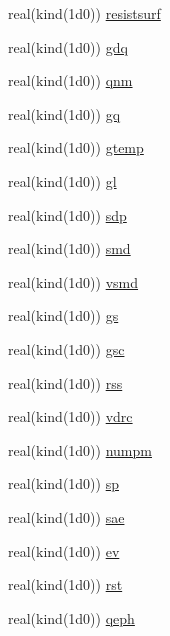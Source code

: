 \begin{DoxyCompactItemize}
\item 
real(kind(1d0)) \hyperlink{namespacesues__data_a678cac1e19ddb70f811693772c031f0c}{resistsurf}
\item 
real(kind(1d0)) \hyperlink{namespacesues__data_a7ef0beda82e8b6758f37961b50f91b8a}{gdq}
\item 
real(kind(1d0)) \hyperlink{namespacesues__data_aa14586435e8c54f775a51aa1dd21ef28}{qnm}
\item 
real(kind(1d0)) \hyperlink{namespacesues__data_a3ad79feef0770aefcae45775fa0c22c8}{gq}
\item 
real(kind(1d0)) \hyperlink{namespacesues__data_afdcda32590540b1055ac240cd92e9325}{gtemp}
\item 
real(kind(1d0)) \hyperlink{namespacesues__data_a4206a1be622f71796ce77db00ec3d459}{gl}
\item 
real(kind(1d0)) \hyperlink{namespacesues__data_a435acd94af1e3a271f4ee348ac811ad4}{sdp}
\item 
real(kind(1d0)) \hyperlink{namespacesues__data_ac73de7c829233718bfd143f4346adf70}{smd}
\item 
real(kind(1d0)) \hyperlink{namespacesues__data_adfce8b9e1538d8a1629df9963a7a6df0}{vsmd}
\item 
real(kind(1d0)) \hyperlink{namespacesues__data_a5eb7587d26ec3542141102660d22dd33}{gs}
\item 
real(kind(1d0)) \hyperlink{namespacesues__data_a0aca98063df71052382d5ab58c2f0d19}{gsc}
\item 
real(kind(1d0)) \hyperlink{namespacesues__data_ae3375f2161517eabda778cd0642076c5}{rss}
\item 
real(kind(1d0)) \hyperlink{namespacesues__data_a79ee74466d17ed05bb20f195934f383b}{vdrc}
\item 
real(kind(1d0)) \hyperlink{namespacesues__data_a06a4500745768a4bcf4886312a028e0c}{numpm}
\item 
real(kind(1d0)) \hyperlink{namespacesues__data_a77243f6b1c7d2baecb0d13f5d98b4318}{sp}
\item 
real(kind(1d0)) \hyperlink{namespacesues__data_ade8fa0a70d4bdc01712ae9438602f21e}{sae}
\item 
real(kind(1d0)) \hyperlink{namespacesues__data_a879c9f9f7cf8597fe30edea62a95bcdd}{ev}
\item 
real(kind(1d0)) \hyperlink{namespacesues__data_a590af4833961785e70adbad8cec1aa66}{rst}
\item 
real(kind(1d0)) \hyperlink{namespacesues__data_a9dfa646ad79f2eadc90c544d5ad4462c}{qeph}
\item 

\end{DoxyCompactItemize}
